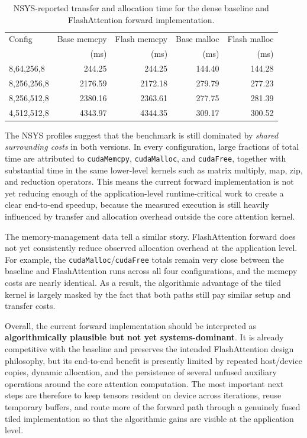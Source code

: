 \documentclass{article}
\begin{document}
\begin{table}[t]
\centering
\scriptsize
\setlength{\tabcolsep}{4pt}
\begin{tabular}{lrrrr}
\hline
Config & Base memcpy & Flash memcpy & Base malloc & Flash malloc \\
& (ms) & (ms) & (ms) & (ms) \\
\hline
8,64,256,8   & 244.25  & 244.25  & 144.40 & 144.28 \\
8,256,256,8  & 2176.59 & 2172.18 & 279.79 & 277.23 \\
8,256,512,8  & 2380.16 & 2363.61 & 277.75 & 281.39 \\
4,512,512,8  & 4343.97 & 4344.35 & 309.17 & 300.52 \\
\hline
\end{tabular}
\caption{NSYS-reported transfer and allocation time for the dense baseline and FlashAttention forward implementation.}
\label{tab:flashforward_memory}
\end{table}

The NSYS profiles suggest that the benchmark is still dominated by \emph{shared surrounding costs} in both versions. In every configuration, large fractions of total time are attributed to \texttt{cudaMemcpy}, \texttt{cudaMalloc}, and \texttt{cudaFree}, together with substantial time in the same lower-level kernels such as matrix multiply, map, zip, and reduction operators. This means the current forward implementation is not yet reducing enough of the application-level runtime-critical work to create a clear end-to-end speedup, because the measured execution is still heavily influenced by transfer and allocation overhead outside the core attention kernel.

The memory-management data tell a similar story. FlashAttention forward does not yet consistently reduce observed allocation overhead at the application level. For example, the \texttt{cudaMalloc}/\texttt{cudaFree} totals remain very close between the baseline and FlashAttention runs across all four configurations, and the memcpy costs are nearly identical. As a result, the algorithmic advantage of the tiled kernel is largely masked by the fact that both paths still pay similar setup and transfer costs.

Overall, the current forward implementation should be interpreted as \textbf{algorithmically plausible but not yet systems-dominant}. It is already competitive with the baseline and preserves the intended FlashAttention design philosophy, but its end-to-end benefit is presently limited by repeated host/device copies, dynamic allocation, and the persistence of several unfused auxiliary operations around the core attention computation. The most important next steps are therefore to keep tensors resident on device across iterations, reuse temporary buffers, and route more of the forward path through a genuinely fused tiled implementation so that the algorithmic gains are visible at the application level.
\end{document}
